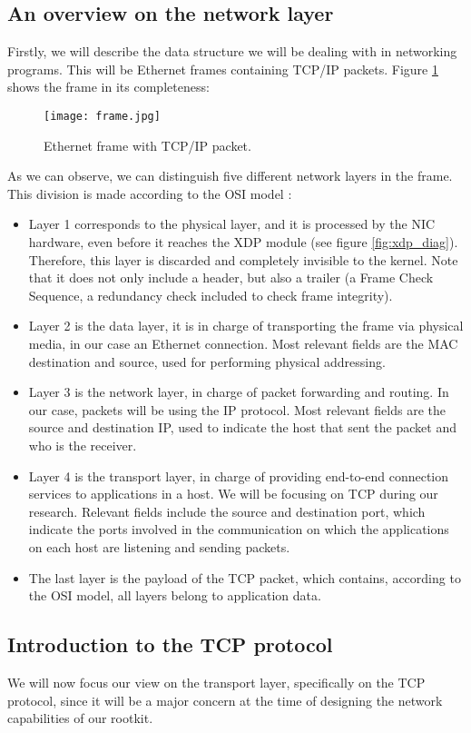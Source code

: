 \subsection{An overview on the network layer}
Firstly, we will describe the data structure we will be dealing with in networking programs. This will be Ethernet frames containing TCP/IP packets. Figure \ref{fig:frame} shows the frame in its completeness:

\begin{figure}[htbp]
	\centering
	\texttt{[image: frame.jpg]}
	\caption{Ethernet frame with TCP/IP packet.}
	\label{fig:frame}
\end{figure}

As we can observe, we can distinguish five different network layers in the frame. This division is made according to the OSI model \cite{network_layers}:
\begin{itemize}
\item Layer 1 corresponds to the physical layer, and it is processed by the NIC hardware, even before it reaches the XDP module (see figure \ref{fig:xdp_diag}). Therefore, this layer is discarded and completely invisible to the kernel. Note that it does not only include a header, but also a trailer (a Frame Check Sequence, a redundancy check included to check frame integrity).
\item Layer 2 is the data layer, it is in charge of transporting the frame via physical media, in our case an Ethernet connection. Most relevant fields are the MAC destination and source, used for performing physical addressing.
\item Layer 3 is the network layer, in charge of packet forwarding and routing. In our case, packets will be using the IP protocol. Most relevant fields are the source and destination IP, used to indicate the host that sent the packet and who is the receiver.
\item Layer 4 is the transport layer, in charge of providing end-to-end connection services to applications in a host. We will be focusing on TCP during our research. Relevant fields include the source and destination port, which indicate the ports involved in the communication on which the applications on each host are listening and sending packets.
\item The last layer is the payload of the TCP packet, which contains, according to the OSI model, all layers belong to application data.
\end{itemize}


\subsection{Introduction to the TCP protocol} \label{subsection:tcp}
We will now focus our view on the transport layer, specifically on the TCP protocol, since it will be a major concern at the time of designing the network capabilities of our rootkit.

